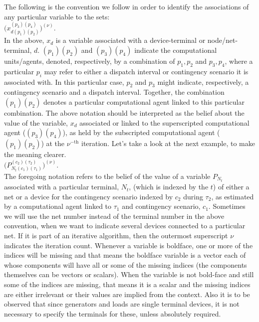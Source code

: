 \documentclass[preprint,12pt,3p]{elsarticle}
\begin{document}
The following is the convention we follow in order to identify the associations of any particular variable to the sets:\\ $\Big(x_{d(p_1)(p_2)}^{(p_3)(p_4)}\Big)^{(\nu)}$.\\In the above, $x_d$ is a variable associated with a device-terminal or node/net-terminal, $d$. ${(p_1)(p_2)}$ and ${(p_3)(p_4)}$ indicate the computational units/agents, denoted, respectively, by a combination of $p_1, p_2$ and $p_3, p_4$, where a particular $p_i$ may refer to either a dispatch interval or contingency scenario it is associated with. In this particular case, $p_2$ and $p_3$ might indicate, respectively, a contingency scenario and a dispatch interval. Together, the combination ${(p_1)(p_2)}$ denotes a particular computational agent linked to this particular combination. The above notation should be interpreted as the belief about the value of the variable, $x_d$ associated or linked to the superscripted computational agent (${(p_3)(p_4)}$), as held by the subscripted computational agent (${(p_1)(p_2)}$) at the $\nu^{-\text{th}}$ iteration. Let's take a look at the next example, to make the meaning clearer.\\ $\Big(P_{{N}_{t}(c_1)(\tau_1)}^{(c_2)(\tau_2)}\Big)^{(\nu)}$.\\The foregoing notation refers to the belief of the value of a variable $P_{N_t}$ associated with a particular terminal, $N_t$, (which is indexed by the $t$) of either a net or a device for the contingency scenario indexed by $c_2$ during $\tau_2$, as estimated by a computational agent linked to $\tau_1$ and contingency scenario, $c_1$. Sometimes we will use the net number instead of the terminal number in the above convention, when we want to indicate several devices connected to a particular net. If it is part of an iterative algorithm, then the outermost superscript $\nu$ indicates the iteration count. Whenever a variable is boldface, one or more of the indices will be missing and that means the boldface variable is a vector each of whose components will have all or some of the missing indices (the components themselves can be vectors or scalars). When the variable is not bold-face and still some of the indices are missing, that means it is a scalar and the missing indices are either irrelevant or their values are implied from the context. Also it is to be observed that since generators and loads are single terminal devices, it is not necessary to specify the terminals for these, unless absolutely required.
\iffalse
\end{document}
